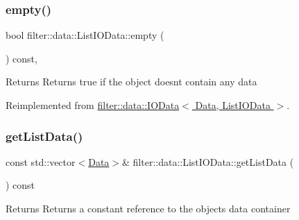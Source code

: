 \subsubsection{\texorpdfstring{empty()}{empty()}}
{\footnotesize\ttfamily bool filter\+::data\+::\+List\+I\+O\+Data\+::empty (\begin{DoxyParamCaption}{ }\end{DoxyParamCaption}) const\hspace{0.3cm}{\ttfamily [inline]}, {\ttfamily [virtual]}}

\begin{DoxyReturn}{Returns}
Returns true if the object doesn\textquotesingle{}t contain any data 
\end{DoxyReturn}


Reimplemented from \hyperlink{classfilter_1_1data_1_1_i_o_data}{filter\+::data\+::\+I\+O\+Data$<$ Data, List\+I\+O\+Data $>$}.

\mbox{\label{classfilter_1_1data_1_1_list_i_o_data_a9f1538f3292101647fea16c372928dc7}} 
\subsubsection{\texorpdfstring{get\+List\+Data()}{getListData()}}
{\footnotesize\ttfamily const std\+::vector$<$\hyperlink{classfilter_1_1data_1_1_data}{Data}$>$\& filter\+::data\+::\+List\+I\+O\+Data\+::get\+List\+Data (\begin{DoxyParamCaption}{ }\end{DoxyParamCaption}) const\hspace{0.3cm}{\ttfamily [inline]}}

\begin{DoxyReturn}{Returns}
Returns a constant reference to the object\textquotesingle{}s data container 
\end{DoxyReturn}
\mbox{\label{classfilter_1_1data_1_1_list_i_o_data_a861011cdf036244dfab132bc024f8971}} 
